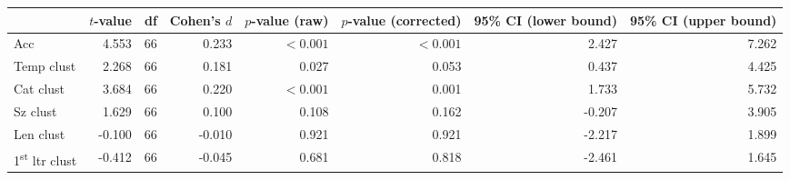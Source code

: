 \begin{tabular}{lrrrrrrr}
\toprule
 & $t$-value & df & Cohen's $d$ & $p$-value (raw) & $p$-value (corrected) & 95\% CI (lower bound) & 95\% CI (upper bound) \\
\midrule
\rowcolor[HTML]{fffee3} Acc & 4.553 & 66 & 0.233 & $< 0.001$ & $< 0.001$ & 2.427 & 7.262 \\
\rowcolor[HTML]{f5f5f5} Temp clust & 2.268 & 66 & 0.181 & 0.027 & 0.053 & 0.437 & 4.425 \\
\rowcolor[HTML]{fffee3} Cat clust & 3.684 & 66 & 0.220 & $< 0.001$ & 0.001 & 1.733 & 5.732 \\
 Sz clust & 1.629 & 66 & 0.100 & 0.108 & 0.162 & -0.207 & 3.905 \\
 Len clust & -0.100 & 66 & -0.010 & 0.921 & 0.921 & -2.217 & 1.899 \\
 1\textsuperscript{st} ltr clust & -0.412 & 66 & -0.045 & 0.681 & 0.818 & -2.461 & 1.645 \\
\bottomrule
\end{tabular}